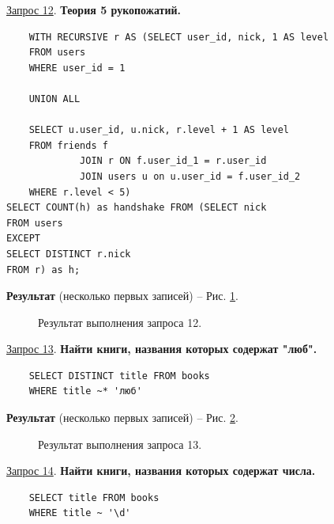\documentclass[a4paper,12pt]{article}
\begin{document}
\underline{Запрос 12}. \textbf{Теория 5 рукопожатий.}
\begin{lstlisting}
    WITH RECURSIVE r AS (SELECT user_id, nick, 1 AS level
    FROM users
    WHERE user_id = 1

    UNION ALL

    SELECT u.user_id, u.nick, r.level + 1 AS level
    FROM friends f
             JOIN r ON f.user_id_1 = r.user_id
             JOIN users u on u.user_id = f.user_id_2
    WHERE r.level < 5)
SELECT COUNT(h) as handshake FROM (SELECT nick
FROM users
EXCEPT
SELECT DISTINCT r.nick
FROM r) as h;
    \end{lstlisting}

\textbf{Результат} (несколько первых записей) -- Рис. \ref{fig:request12}.

\begin{figure}[ht]
    \caption{Результат выполнения запроса 12.}
    \label{fig:request12}
\end{figure}

\underline{Запрос 13}. \textbf{Найти книги, названия которых содержат "люб".}
\begin{lstlisting}
    SELECT DISTINCT title FROM books
    WHERE title ~* 'люб'
    \end{lstlisting}

\textbf{Результат} (несколько первых записей) -- Рис. \ref{fig:request13}.

\begin{figure}[ht]
    \caption{Результат выполнения запроса 13.}
    \label{fig:request13}
\end{figure}

\underline{Запрос 14}. \textbf{Найти книги, названия которых содержат числа.}
\begin{lstlisting}
    SELECT title FROM books
    WHERE title ~ '\d'
    \end{lstlisting}
\end{document}
